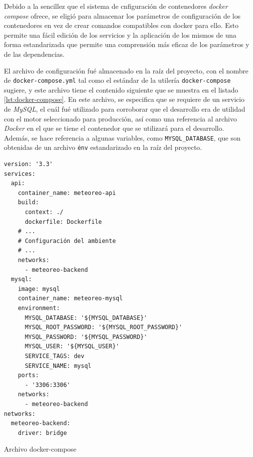 
Debido a la sencillez que el sistema de cnfiguración de contenedores \emph{docker compose} ofrece, se eligió para almacenar los parámetros de configuración de los contenedores en vez de crear comandos compatibles con docker para ello. Esto permite una fácil edición de los servicios y la aplicación de los mismos de una forma estandarizada que permite una comprensión más eficaz de los parámetros y de las dependencias.

El archivo de configuración fué almacenado en la raíz del proyecto, con el nombre de \texttt{docker-compose.yml}  tal como el estándar de la utilería \texttt{docker-compose} sugiere, y este archivo tiene el contenido siguiente que se muestra en el listado \ref{lst:docker-compose}. En este archivo, se especifica que se requiere de un servicio de \textit{MySQL}, el cuál fué utilizado para corroborar que el desarrollo era de utilidad con el motor seleccionado para producción, así como una referencia al archivo \textit{Docker} en el que se tiene el contenedor que se utilizará para el desarrollo. Además, se hace referencia a algunas variables, como \texttt{MYSQL\_DATABASE}, que son obtenidas de un archivo \texttt{\.env} estandarizado en la raíz del proyecto.

\begin{listing}
\begin{verbatim}
version: '3.3'
services:
  api:
    container_name: meteoreo-api
    build:
      context: ./
      dockerfile: Dockerfile
    # ...
    # Configuración del ambiente
    # ...
    networks:
      - meteoreo-backend
  mysql:
    image: mysql
    container_name: meteoreo-mysql
    environment:
      MYSQL_DATABASE: '${MYSQL_DATABASE}'
      MYSQL_ROOT_PASSWORD: '${MYSQL_ROOT_PASSWORD}'
      MYSQL_PASSWORD: '${MYSQL_PASSWORD}'
      MYSQL_USER: '${MYSQL_USER}'
      SERVICE_TAGS: dev
      SERVICE_NAME: mysql
    ports:
      - '3306:3306'
    networks:
      - meteoreo-backend
networks:
  meteoreo-backend:
    driver: bridge
\end{verbatim}
\caption{Archivo docker-compose}
\label{lst:docker-compose}
\end{listing}

